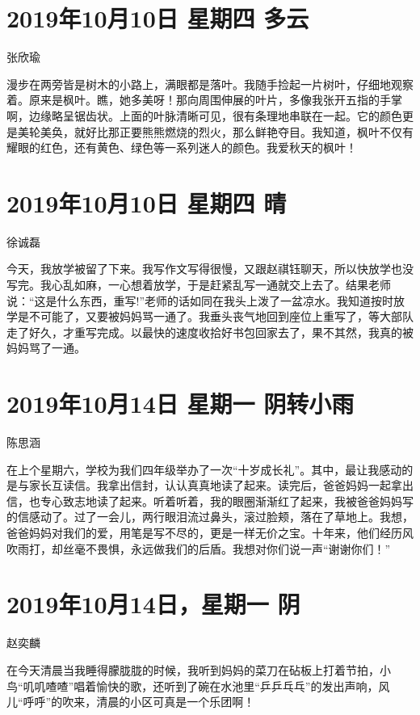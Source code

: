 \section{2019年10月10日 星期四 多云}

张欣瑜

漫步在两旁皆是树木的小路上，满眼都是落叶。我随手捡起一片树叶，仔细地观察着。原来是枫叶。瞧，她多美呀！那向周围伸展的叶片，多像我张开五指的手掌啊，边缘略呈锯齿状。上面的叶脉清晰可见，很有条理地串联在一起。它的颜色更是美轮美奂，就好比那正要熊熊燃烧的烈火，那么鲜艳夺目。我知道，枫叶不仅有耀眼的红色，还有黄色、绿色等一系列迷人的颜色。我爱秋天的枫叶！

\section{2019年10月10日 星期四 晴}

徐诚磊

今天，我放学被留了下来。我写作文写得很慢，又跟赵祺钰聊天，所以快放学也没写完。我心乱如麻，一心想着放学，于是赶紧乱写一通就交上去了。结果老师说：``这是什么东西，重写!''老师的话如同在我头上泼了一盆凉水。我知道按时放学是不可能了，又要被妈妈骂一通了。我垂头丧气地回到座位上重写了，等大部队走了好久，才重写完成。以最快的速度收拾好书包回家去了，果不其然，我真的被妈妈骂了一通。

\section{2019年10月14日 星期一 阴转小雨}

陈思涵

在上个星期六，学校为我们四年级举办了一次``十岁成长礼''。其中，最让我感动的是与家长互读信。我拿出信封，认认真真地读了起来。读完后，爸爸妈妈一起拿出信，也专心致志地读了起来。听着听着，我的眼圈渐渐红了起来，我被爸爸妈妈写的信感动了。过了一会儿，两行眼泪流过鼻头，滚过脸颊，落在了草地上。我想，爸爸妈妈对我们的爱，用笔是写不尽的，更是一样无价之宝。十年来，他们经历风吹雨打，却丝毫不畏惧，永远做我们的后盾。我想对你们说一声``谢谢你们！''

\section{2019年10月14日，星期一 阴}

赵奕麟

在今天清晨当我睡得朦胧胧的时候，我听到妈妈的菜刀在砧板上打着节拍，小鸟``叽叽喳喳''唱着愉快的歌，还听到了碗在水池里``乒乒乓乓''的发出声响，风儿``呼呼''的吹来，清晨的小区可真是一个乐团啊！

